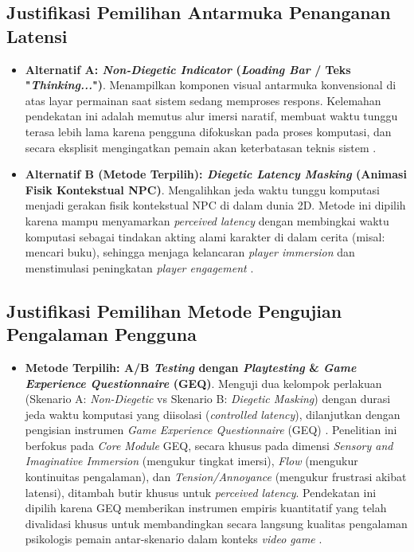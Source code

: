 \subsection{Justifikasi Pemilihan Antarmuka Penanganan Latensi}
\begin{itemize}
    \item \textbf{Alternatif A: \textit{Non-Diegetic Indicator} (\textit{Loading Bar} / Teks "\textit{Thinking...}")}. Menampilkan komponen visual antarmuka konvensional di atas layar permainan saat sistem sedang memproses respons. Kelemahan pendekatan ini adalah memutus alur imersi naratif, membuat waktu tunggu terasa lebih lama karena pengguna difokuskan pada proses komputasi, dan secara eksplisit mengingatkan pemain akan keterbatasan teknis sistem \citep{andersson2024effects, elfleet2024investigating}.
    \item \textbf{Alternatif B (Metode Terpilih): \textit{Diegetic Latency Masking} (Animasi Fisik Kontekstual NPC)}. Mengalihkan jeda waktu tunggu komputasi menjadi gerakan fisik kontekstual NPC di dalam dunia 2D. Metode ini dipilih karena mampu menyamarkan \textit{perceived latency} dengan membingkai waktu komputasi sebagai tindakan akting alami karakter di dalam cerita (misal: mencari buku), sehingga menjaga kelancaran \textit{player immersion} dan menstimulasi peningkatan \textit{player engagement} \citep{andersson2024effects, csepregi2021effect, wei2025mind}.
\end{itemize}

\subsection{Justifikasi Pemilihan Metode Pengujian Pengalaman Pengguna}
\begin{itemize}
    \item \textbf{Metode Terpilih: A/B \textit{Testing} dengan \textit{Playtesting} \& \textit{Game Experience Questionnaire} (GEQ)}. Menguji dua kelompok perlakuan (Skenario A: \textit{Non-Diegetic} vs Skenario B: \textit{Diegetic Masking}) dengan durasi jeda waktu komputasi yang diisolasi (\textit{controlled latency}), dilanjutkan dengan pengisian instrumen \textit{Game Experience Questionnaire} (GEQ) \citep{ijsselsteijn2013game}. Penelitian ini berfokus pada \textit{Core Module} GEQ, secara khusus pada dimensi \textit{Sensory and Imaginative Immersion} (mengukur tingkat imersi), \textit{Flow} (mengukur kontinuitas pengalaman), dan \textit{Tension/Annoyance} (mengukur frustrasi akibat latensi), ditambah butir khusus untuk \textit{perceived latency}. Pendekatan ini dipilih karena GEQ memberikan instrumen empiris kuantitatif yang telah divalidasi khusus untuk membandingkan secara langsung kualitas pengalaman psikologis pemain antar-skenario dalam konteks \textit{video game} \citep{csepregi2021effect, elfleet2024investigating, ijsselsteijn2013game}.
\end{itemize}